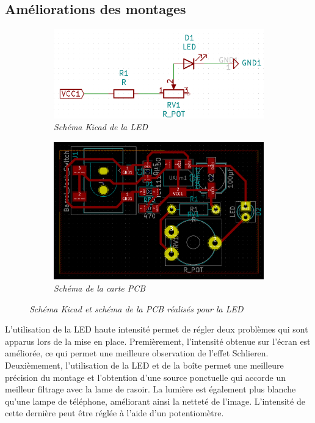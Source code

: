\subsection{Améliorations des montages}
\begin{figure}[H]
	\centering
	\begin{subfigure}[t]{0.49\textwidth}
		\centering
		\includegraphics[scale=0.2]{figures/schema_kicad.png}
		\caption{\small{\textit{Schéma Kicad de la LED}}}
		\label{fig:led_kicad}
	\end{subfigure}%
	\begin{subfigure}[t]{0.49\textwidth}
		\centering
		\includegraphics[scale=0.2]{figures/schema_pcb.png}
		\caption{\small{\textit{Schéma de la carte PCB}}}
		\label{fig:led_pcb}
	\end{subfigure}
	\caption{\small{\textit{Schéma Kicad et schéma de la PCB réalisés pour la LED}}}
	\label{fig:led}
\end{figure}
L’utilisation de la LED haute intensité permet de régler deux problèmes qui sont apparus lors de la mise en place. Premièrement, l’intensité obtenue sur l’écran est améliorée, ce qui permet une meilleure observation de l’effet Schlieren. Deuxièmement, l’utilisation de la LED et de la boîte permet une meilleure précision du montage et l’obtention d’une source ponctuelle qui accorde un meilleur filtrage avec la lame de rasoir. La lumière est également plus blanche qu’une lampe de téléphone, améliorant ainsi la netteté de l’image. L’intensité de cette dernière peut être réglée à l’aide d’un potentiomètre.
